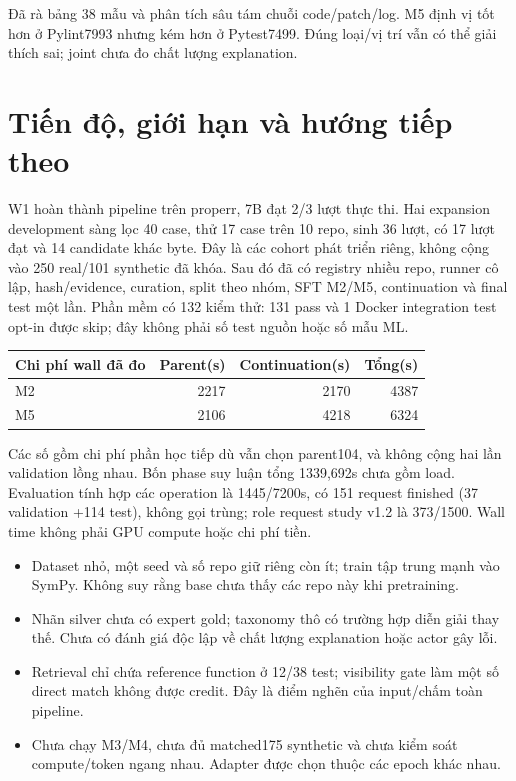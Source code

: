 \documentclass[12pt,a4paper]{article}
\begin{document}
Đã rà bảng 38 mẫu và phân tích sâu tám chuỗi code/patch/log. M5 định vị tốt hơn ở Pylint7993 nhưng kém hơn ở Pytest7499. Đúng loại/vị trí vẫn có thể giải thích sai; joint chưa đo chất lượng explanation.

\nextpage
\section{Tiến độ, giới hạn và hướng tiếp theo}
W1 hoàn thành pipeline trên properr, 7B đạt 2/3 lượt thực thi. Hai expansion development sàng lọc 40 case, thử 17 case trên 10 repo, sinh 36 lượt, có 17 lượt đạt và 14 candidate khác byte. Đây là các cohort phát triển riêng, không cộng vào 250 real/101 synthetic đã khóa. Sau đó đã có registry nhiều repo, runner cô lập, hash/evidence, curation, split theo nhóm, SFT M2/M5, continuation và final test một lần. Phần mềm có 132 kiểm thử: 131 pass và 1 Docker integration test opt-in được skip; đây không phải số test nguồn hoặc số mẫu ML.

\begin{center}\small
\begin{tabular}{lrrr}\toprule
Chi phí wall đã đo & Parent(s)& Continuation(s)& Tổng(s)\\\midrule
M2 &2217&2170&4387\\
M5 &2106&4218&6324\\\bottomrule
\end{tabular}\end{center}
Các số gồm chi phí phần học tiếp dù vẫn chọn parent104, và không cộng hai lần validation lồng nhau. Bốn phase suy luận tổng 1339,692s chưa gồm load. Evaluation tính hợp các operation là 1445/7200s, có 151 request finished (37 validation +114 test), không gọi trùng; role request study v1.2 là 373/1500. Wall time không phải GPU compute hoặc chi phí tiền.

\begin{itemize}
\item Dataset nhỏ, một seed và số repo giữ riêng còn ít; train tập trung mạnh vào SymPy. Không suy rằng base chưa thấy các repo này khi pretraining.
\item Nhãn silver chưa có expert gold; taxonomy thô có trường hợp diễn giải thay thế. Chưa có đánh giá độc lập về chất lượng explanation hoặc actor gây lỗi.
\item Retrieval chỉ chứa reference function ở 12/38 test; visibility gate làm một số direct match không được credit. Đây là điểm nghẽn của input/chấm toàn pipeline.
\item Chưa chạy M3/M4, chưa đủ matched175 synthetic và chưa kiểm soát compute/token ngang nhau. Adapter được chọn thuộc các epoch khác nhau.
\end{itemize}
\end{document}
